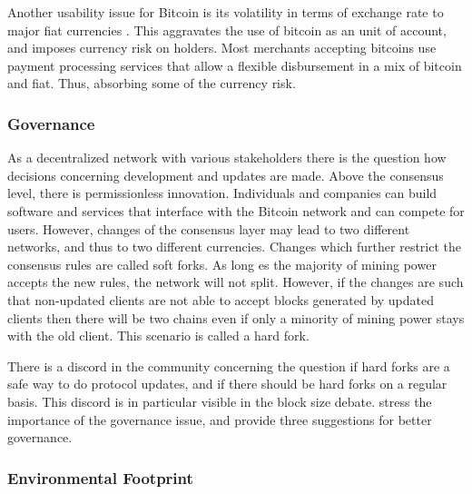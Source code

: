 Another usability issue for Bitcoin is its volatility in terms of exchange rate to major fiat currencies \parencite{Luther2014,Sapuric2014}. This aggravates the use of bitcoin as an unit of account, and imposes currency risk on holders. Most merchants accepting bitcoins use payment processing services that allow a flexible disbursement in a mix of bitcoin and fiat. Thus, absorbing some of the currency risk.





\subsubsection{Governance}

As a decentralized network with various stakeholders there is the question how decisions concerning development and updates are made. Above the consensus level, there is permissionless innovation. Individuals and companies can build software and services that interface with the Bitcoin network and can compete for users. However, changes of the consensus layer may lead to two different networks, and thus to two different currencies. Changes which further restrict the consensus rules are called soft forks. As long es the majority of mining power accepts the new rules, the network will not split. However, if the changes are such that non-updated clients are not able to accept blocks generated by updated clients then there will be two chains even if only a minority of mining power stays with the old client. This scenario is called a hard fork. 

There is a discord in the community concerning the question if hard forks are a safe way to do protocol updates, and if there should be hard forks on a regular basis. This discord is in particular visible in the block size debate. \cite{narayanan2015b} stress the importance of the governance issue, and provide three suggestions for better governance.

\subsubsection{Environmental Footprint}

